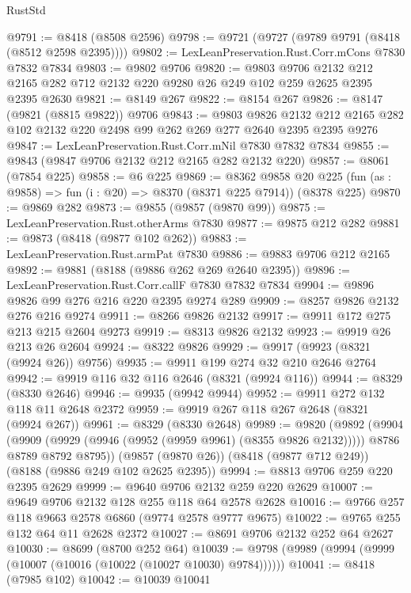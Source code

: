 \begin{lexlean}{RustStd}
\begin{coremodule}
@9791 := @8418 (@8508 @2596)
@9798 := @9721 (@9727 (@9789 @9791 (@8418 (@8512 @2598 @2395))))
@9802 := LexLeanPreservation.Rust.Corr.mCons @7830 @7832 @7834
@9803 := @9802 @9706
@9820 := @9803
    @9706
    @2132
    @212
    @2165
    @282
    @712
    @2132
    @220
    @9280
    @26
    @249
    @102
    @259
    @2625
    @2395
    @2395
    @2630
@9821 := @8149 @267
@9822 := @8154 @267
@9826 := @8147 (@9821 (@8815 @9822)) @9706
@9843 := @9803
    @9826
    @2132
    @212
    @2165
    @282
    @102
    @2132
    @220
    @2498
    @99
    @262
    @269
    @277
    @2640
    @2395
    @2395
    @9276
@9847 := LexLeanPreservation.Rust.Corr.mNil @7830 @7832 @7834
@9855 := @9843 (@9847 @9706 @2132 @212 @2165 @282 @2132 @220)
@9857 := @8061 (@7854 @225)
@9858 := @6 @225
@9869 := @8362
    @9858
    @20
    @225
    (fun (as : @9858) => fun (i : @20) => @8370 (@8371 @225 @7914))
    (@8378 @225)
@9870 := @9869 @282
@9873 := @9855 (@9857 (@9870 @99))
@9875 := LexLeanPreservation.Rust.otherArms @7830
@9877 := @9875 @212 @282
@9881 := @9873 (@8418 (@9877 @102 @262))
@9883 := LexLeanPreservation.Rust.armPat @7830
@9886 := @9883 @9706 @212 @2165
@9892 := @9881 (@8188 (@9886 @262 @269 @2640 @2395))
@9896 := LexLeanPreservation.Rust.Corr.callF @7830 @7832 @7834
@9904 := @9896 @9826 @99 @276 @216 @220 @2395 @9274 @289
@9909 := @8257 @9826 @2132 @276 @216 @9274
@9911 := @8266 @9826 @2132
@9917 := @9911 @172 @275 @213 @215 @2604 @9273
@9919 := @8313 @9826 @2132
@9923 := @9919 @26 @213 @26 @2604
@9924 := @8322 @9826
@9929 := @9917 (@9923 (@8321 (@9924 @26)) @9756)
@9935 := @9911 @199 @274 @32 @210 @2646 @2764
@9942 := @9919 @116 @32 @116 @2646 (@8321 (@9924 @116))
@9944 := @8329 (@8330 @2646)
@9946 := @9935 (@9942 @9944)
@9952 := @9911 @272 @132 @118 @11 @2648 @2372
@9959 := @9919 @267 @118 @267 @2648 (@8321 (@9924 @267))
@9961 := @8329 (@8330 @2648)
@9989 := @9820
    (@9892
      (@9904
        (@9909 (@9929 (@9946 (@9952 (@9959 @9961) (@8355 @9826 @2132)))))
        @8786
        @8789
        @8792
        @8795))
    (@9857 (@9870 @26))
    (@8418 (@9877 @712 @249))
    (@8188 (@9886 @249 @102 @2625 @2395))
@9994 := @8813 @9706 @259 @220 @2395 @2629
@9999 := @9640 @9706 @2132 @259 @220 @2629
@10007 := @9649 @9706 @2132 @128 @255 @118 @64 @2578 @2628
@10016 := @9766 @257 @118 @9663 @2578 @6860 (@9774 @2578 @9777 @9675)
@10022 := @9765 @255 @132 @64 @11 @2628 @2372
@10027 := @8691 @9706 @2132 @252 @64 @2627
@10030 := @8699 (@8700 @252 @64)
@10039 := @9798 (@9989 (@9994 (@9999 (@10007 (@10016 (@10022 (@10027 @10030) @9784))))))
@10041 := @8418 (@7985 @102)
@10042 := @10039 @10041

\end{coremodule}
\end{lexlean}
